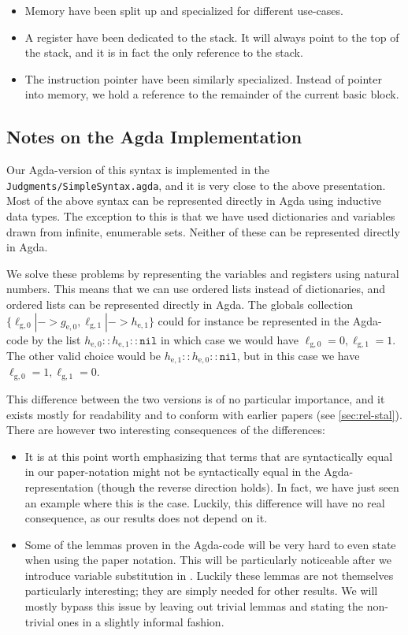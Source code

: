 \begin{itemize}
\item Memory have been split up and specialized for different use-cases.
\item A register have been dedicated to the stack. It will always point to the
  top of the stack, and it is in fact the only reference to the stack.
\item The instruction pointer have been similarly specialized. Instead of
  pointer into memory, we hold a reference to the remainder of the current basic
  block.
\end{itemize}


\subsection{Notes on the Agda Implementation}

Our Agda-version of this syntax is implemented in the
\texttt{Judgments/SimpleSyntax.agda}, and it is very close to the above
presentation. Most of the above syntax can be represented directly in Agda using
inductive data types. The exception to this is that we have used dictionaries
and variables drawn from infinite, enumerable sets. Neither of these can be
represented directly in Agda.

We solve these problems by representing the variables and registers using
natural numbers. This means that we can use ordered lists instead of
dictionaries, and ordered lists can be represented directly in Agda. The globals
collection
$\{\ell_{\mathrm{g},0} |-> g_{\mathrm{e},0}, \ell_{\mathrm{g},1} |->
h_{\mathrm{e},1}\}$ could for instance be represented in the Agda-code by the
list $h_{\mathrm{e},0} :: h_{\mathrm{e},1} :: \mathtt{nil}$ in which case we
would have $\ell_{\mathrm{g},0} = 0, \ell_{\mathrm{g},1} = 1$. The other valid
choice would be $h_{\mathrm{e},1} :: h_{\mathrm{e},0} :: \mathtt{nil}$, but in
this case we have $\ell_{\mathrm{g},0} = 1, \ell_{\mathrm{g},1} = 0$.

This difference between the two versions is of no particular importance, and it
exists mostly for readability and to conform with earlier papers (see
\cref{sec:rel-stal}). There are however two interesting consequences of the
differences:

\begin{itemize}
\item It is at this point worth emphasizing that terms that are syntactically
  equal in our paper-notation might not be syntactically equal in the
  Agda-representation (though the reverse direction holds). In fact, we have
  just seen an example where this is the case. Luckily, this difference will
  have no real consequence, as our results does not depend on it.
\item Some of the lemmas proven in the Agda-code will be very hard to even state
  when using the paper notation. This will be particularly noticeable after we
  introduce variable substitution in \ATAL. Luckily these lemmas are not
  themselves particularly interesting; they are simply needed for other
  results. We will mostly bypass this issue by leaving out trivial lemmas and
  stating the non-trivial ones in a slightly informal fashion.
\end{itemize}

